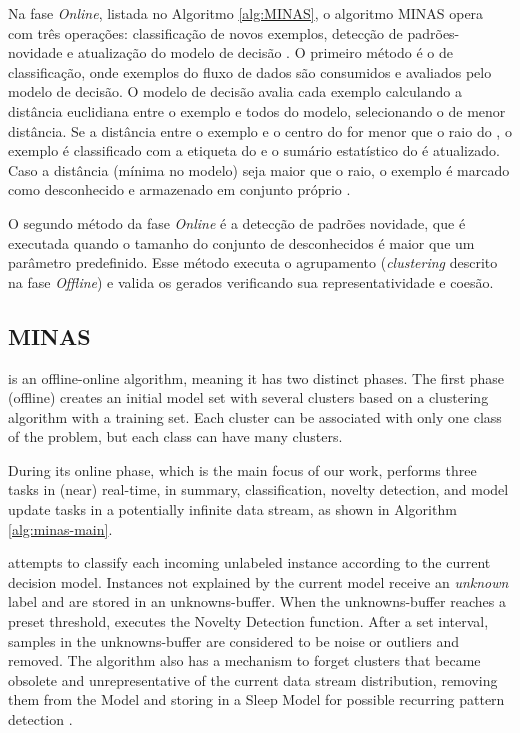 Na fase \emph{Online}, listada no Algoritmo \ref{alg:MINAS}, o algoritmo MINAS
opera com três operações: classificação de novos exemplos, detecção de 
padrões-novidade e atualização do modelo de decisão \cite{Faria2015minas}.
O primeiro método é o de classificação, onde exemplos do fluxo de dados
são consumidos e avaliados pelo modelo de decisão.
O modelo de decisão avalia cada exemplo calculando a distância euclidiana
entre o exemplo e todos \mclusters do modelo, selecionando o
\mcluster de menor distância.
Se a distância entre o exemplo e o centro do \mcluster for menor que
o raio do \mcluster, o exemplo é classificado com a etiqueta do \mcluster
e o sumário estatístico do \mcluster é atualizado.
Caso a distância (mínima no modelo) seja maior que o raio,
o exemplo é marcado como desconhecido e armazenado
em conjunto próprio \cite{Faria2015minas}.

O segundo método da fase \emph{Online} é a detecção de padrões novidade,
que é executada quando o tamanho do conjunto de desconhecidos é maior
que um parâmetro predefinido.
Esse método executa o agrupamento (\emph{clustering} descrito na fase
\emph{Offline}) e valida os \mclusters gerados verificando sua representatividade
e coesão.

\subsection{MINAS}
\label{sec:minas}

\minas \cite{Faria2013Minas,Faria2015minas} is an offline-online \nd algorithm,
meaning it has two distinct phases. The first phase (offline) creates an initial
model set with several clusters based on a clustering algorithm with a training
set.
Each cluster can be associated with only one class of the problem, but each
class can have many clusters.

During its online phase, which is the main focus of our work, \minas performs
three tasks in (near) real-time,
in summary,
classification, novelty detection, and model update tasks
in a potentially infinite data stream, as shown in Algorithm \ref{alg:minas-main}.

\minas attempts to classify each incoming unlabeled instance according to the
current decision model. Instances not explained by the current model
receive an \textit{unknown} label and are stored in an unknowns-buffer.
When the unknowns-buffer reaches a preset threshold, \minas executes the
Novelty Detection function.
After a set interval, samples in the unknowns-buffer are considered to be
noise or outliers and removed.
The algorithm also has a mechanism to forget clusters that became obsolete and
unrepresentative of the current data stream distribution, removing them from
the Model and storing in a Sleep Model for possible recurring pattern
detection \cite{Faria2015minas}.

